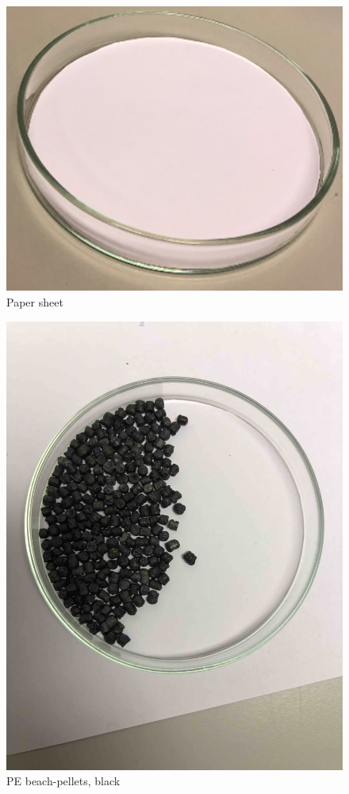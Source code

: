 \begin{appendices}
\begin{figure}
    \centering
    \includegraphics[width = 12cm]{Images/appendix/papir.png}
    \caption[Paper Sheet]{Paper sheet}
    \label{fig:paper}
\end{figure}

\begin{figure}
    \centering
    \includegraphics[width = 12cm]{Images/appendix/PE-pellets-beached-texel-black.jpg}
    \caption[PE Beach Pellets, Black]{PE beach-pellets, black}
    \label{fig:pe_beach_b}
\end{figure}


\end{appendices}
